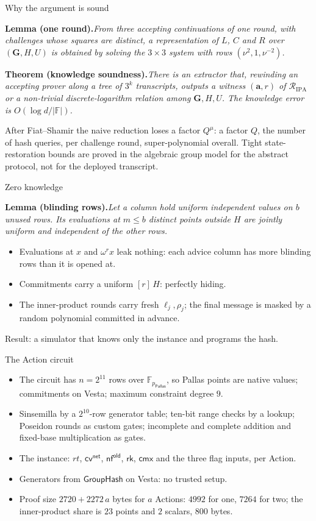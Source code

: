 \documentclass[aspectratio=169,11pt]{beamer}
\newcommand{\F}{\mathbb{F}}
\newcommand{\nfsym}{\ensuremath{\mathsf{nf}}}
\newcommand{\cmx}{\ensuremath{\mathsf{cmx}}}
\newcommand{\cvsym}{\ensuremath{\mathsf{cv}}}
\newcommand{\rksym}{\ensuremath{\mathsf{rk}}}
\newcommand{\GroupHash}{\ensuremath{\mathsf{GroupHash}}}
\newcommand{\pP}{p_{\mathsf{Pallas}}}
\newcommand{\FP}{\F_{\pP}}
\newcommand{\rk}{\rksym}
\newcommand{\cvnet}{\cvsym^{\mathsf{net}}}
\newcommand{\old}{^{\mathsf{old}}}
\newcommand{\Rel}{\mathcal{R}}
\newcommand{\bfa}{\mathbf{a}}
\newcommand{\bfG}{\mathbf{G}}
\newcommand{\stmt}[2]{\par\smallskip\noindent\textbf{#1}\enspace\textit{#2}\par}
\begin{document}
\begin{frame}{Why the argument is sound}
\stmt{Lemma (one round).}{From three accepting continuations of one round,
with challenges whose squares are distinct, a representation of $L$, $C$
and $R$ over $(\bfG, H, U)$ is obtained by solving the $3 \times 3$ system
with rows $(\nu^2, 1, \nu^{-2})$.}
\vfill
\stmt{Theorem (knowledge soundness).}{There is an extractor that, rewinding
an accepting prover along a tree of $3^k$ transcripts, outputs a witness
$(\bfa, r)$ of $\Rel_{\mathrm{IPA}}$ or a non-trivial discrete-logarithm
relation among $\bfG, H, U$. The knowledge error is $O(\log d / |\F|)$.}
\vfill
After Fiat--Shamir the naive reduction loses a factor $Q^{\mu}$: a factor
$Q$, the number of hash queries, per challenge round, super-polynomial
overall. Tight state-restoration bounds are proved in the algebraic group
model for the abstract protocol, not for the deployed transcript.
\end{frame}

\begin{frame}{Zero knowledge}
\stmt{Lemma (blinding rows).}{Let a column hold uniform independent values
on $b$ unused rows. Its evaluations at $m \le b$ distinct points outside $H$
are jointly uniform and independent of the other rows.}
\vfill
\begin{itemize}\itemsep6pt
\item Evaluations at $x$ and $\omega^r x$ leak nothing: each advice column
  has more blinding rows than it is opened at.
\item Commitments carry a uniform $[r]\,H$: perfectly hiding.
\item The inner-product rounds carry fresh $\ell_j, \rho_j$; the final
  message is masked by a random polynomial committed in advance.
\end{itemize}
\vfill
Result: a simulator that knows only the instance and programs the hash.
\end{frame}

\begin{frame}{The Action circuit}
\begin{itemize}\itemsep6pt
\item The circuit has $n = 2^{11}$ rows over $\FP$, so Pallas points are native values;
  commitments on Vesta; maximum constraint degree $9$.
\item Sinsemilla by a $2^{10}$-row generator table; ten-bit range checks by
  a lookup; Poseidon rounds as custom gates; incomplete and complete
  addition and fixed-base multiplication as gates.
\item The instance: $\mathit{rt}$, $\cvnet$, $\nfsym\old$, $\rk$, $\cmx$ and
  the three flag inputs, per Action.
\item Generators from $\GroupHash$ on Vesta: no trusted setup.
\item Proof size $2720 + 2272\,a$ bytes for $a$ Actions: $4992$ for one,
  $7264$ for two; the inner-product share is $23$ points and $2$ scalars, $800$ bytes.
\end{itemize}
\end{frame}
\end{document}
